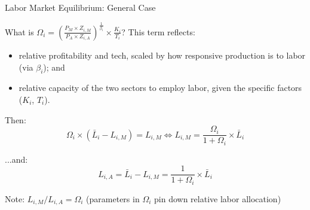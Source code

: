 \documentclass[notes,11pt, aspectratio=169, xcolor=table]{beamer}
\newenvironment{wideitemize}{\itemize\addtolength{\itemsep}{10pt}}{\enditemize}
\begin{document}
\begin{frame}{Labor Market Equilibrium: General Case}
    \begin{wideitemize}
        \item What is $\Omega_i = \left( \frac{P_{M} \times  Z_{i,M}}{P_{A} \times  Z_{i,A}} \right)^{\frac{1}{\beta_i}} \times  \frac{K_{i}}{T_{i}}$? This term reflects: 
        \begin{itemize}
            \item relative profitability and tech, scaled by how responsive production is to labor (via $\beta_i$); and
            \item relative capacity of the two sectors to employ labor, given the specific factors ($K_i$, $T_i$).
        \end{itemize}
        \item<2-> Then:
        \begin{equation*}
         \Omega_i \times (\bar{L}_i - L_{i,M}) =  L_{i,M} \iff  L_{i,M} = \frac{\Omega_i}{1+\Omega_i} \times \bar{L}_i
         \end{equation*}
         \item<3-> ...and:
        \begin{equation*}
           L_{i,A} = \bar{L}_i - L_{i,M} =  \frac{1}{1+\Omega_i}  \times  \bar{L}_i
        \end{equation*}

        \item<4-> Note: $L_{i,M} / L_{i,A} = \Omega_i$
        \qquad (parameters in $\Omega_i$ pin down relative labor allocation) 
        
    \end{wideitemize}
\end{frame}
\end{document}
